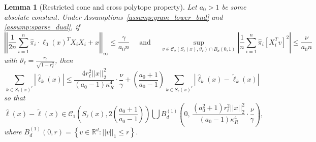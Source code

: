 \documentclass[10pt,a4paper]{amsart}
\theoremstyle{plain}
\newtheorem{lemma}[theorem]{Lemma}
\theoremstyle{remark}
\renewcommand{\hat}{\widehat}
\renewcommand{\tilde}{\widetilde}
\newcommand{\norm}[1]{\left|\left| #1 \right|\right|}
\begin{document}
\begin{lemma}[Restricted cone and cross polytope property]
	\label{lem:res_cross_poly}
	Let $a_0 >1$ be some absolute constant. Under Assumptions~\ref{assump:gram_lower_bnd} and \ref{assump:sparse_dual}, if 
	\begin{equation}
		\label{res_cross_poly_cond}
		\norm{\frac{1}{2n}\sum_{i=1}^n \hat{\pi}_i\cdot \ell_0(x)^T X_i X_i +x}_{\infty} \leq \frac{\gamma}{a_0 n} \quad \text{ and } \quad \sup_{v\in \mathcal{C}_2\left(S_{\ell}(x), \vartheta_{\ell}\right)\cap B_d(0,1)} \left|\frac{1}{n} \sum_{i=1}^n \hat{\pi}_i\left[X_i^Tv\right]^2 \right| \leq \frac{\nu}{a_0 n}
	\end{equation}
	with $\vartheta_{\ell} = \frac{r_{\ell}}{\sqrt{1-r_{\ell}^2}}$, then
	$$\sum_{k\in S_{\ell}(x)^c} \left|\hat{\ell}_k(x) \right| \leq \frac{4r_{\ell}^2 \norm{x}_2^2}{(a_0-1) \kappa_R^4}\cdot \frac{\nu}{\gamma} + \left(\frac{a_0+1}{a_0-1}\right) \sum_{k\in S_{\ell}(x)^c} \left|\hat{\ell}_k(x) -\tilde{\ell}_k(x) \right|$$
	so that 
	$$\hat{\ell}(x)-\tilde{\ell}(x) \in \mathcal{C}_1\left(S_{\ell}(x), 2\left(\frac{a_0+1}{a_0-1}\right) \right) \bigcup B_d^{(1)}\left(0,\, \frac{(a_0^2+1)r_{\ell}^2 \norm{x}_2^2}{(a_0-1) \kappa_R^4} \cdot \frac{\nu}{\gamma}\right),$$ where $B_d^{(1)}(0,r) = \left\{v\in \mathbb{R}^d: \norm{v}_1 \leq r\right\}$.
\end{lemma}
\end{document}
